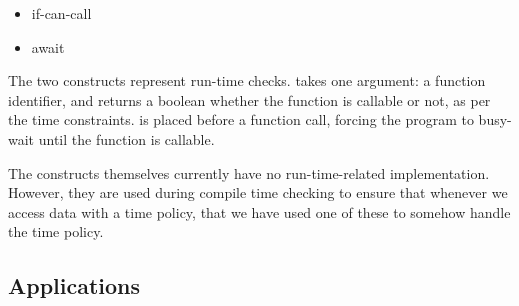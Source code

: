 \begin{itemize}
  \item if-can-call 
  \item await 
\end{itemize}

The two constructs represent run-time checks.
 takes one argument: a function identifier, and returns a boolean whether the function is callable or not, as per the time constraints.
 is placed before a function call, forcing the program to busy-wait until the function is callable.

The constructs themselves currently have no run-time-related implementation.
However, they are used during compile time checking to ensure that whenever we access data with a time policy, that we have used one of these to somehow handle the time policy.

\subsection{Applications}
